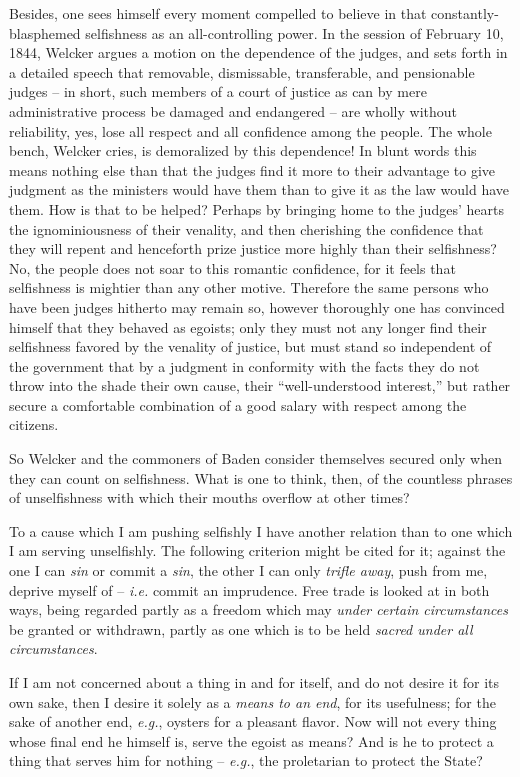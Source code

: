 \documentclass[12pt,a4paper]{book}
\begin{document}
Besides, one sees himself every moment compelled to believe in that 
constantly-blasphemed selfishness as an all-controlling power. In the session 
of February 10, 1844, Welcker argues a motion on the dependence of the judges, 
and sets forth in a detailed speech that removable, dismissable, transferable, 
and pensionable judges -- in short, such members of a court of justice as can 
by mere administrative process be damaged and endangered -- are wholly without 
reliability, yes, lose all respect and all confidence among the people. The 
whole bench, Welcker cries, is demoralized by this dependence! In blunt words 
this means nothing else than that the judges find it more to their advantage 
to give judgment as the ministers would have them than to give it as the law 
would have them. How is that to be helped? Perhaps by bringing home to the 
judges' hearts the ignominiousness of their venality, and then cherishing the 
confidence that they will repent and henceforth prize justice more highly than 
their selfishness? No, the people does not soar to this romantic confidence, 
for it feels that selfishness is mightier than any other motive. Therefore the 
same persons who have been judges hitherto may remain so, however thoroughly 
one has convinced himself that they behaved as egoists; only they must not any 
longer find their selfishness favored by the venality of justice, but must 
stand so independent of the government that by a judgment in conformity with 
the facts they do not throw into the shade their own cause, their 
``well-understood interest,'' but rather secure a comfortable combination of 
a good salary with respect among the citizens.

So Welcker and the commoners of Baden consider themselves secured only when 
they can count on selfishness. What is one to think, then, of the countless 
phrases of unselfishness with which their mouths overflow at other times?

To a cause which I am pushing selfishly I have another relation than to one 
which I am serving unselfishly. The following criterion might be cited for it; 
against the one I can \textit{sin} or commit a \textit{sin}, the other I can 
only \textit{trifle away}, push from me, deprive myself of -- \textit{i.e.} 
commit an imprudence. Free trade is looked at in both ways, being regarded 
partly as a freedom which may \textit{under certain circumstances} be granted 
or withdrawn, partly as one which is to be held \textit{sacred under all 
circumstances}.

If I am not concerned about a thing in and for itself, and do not desire it 
for its own sake, then I desire it solely as a \textit{means to an end}, for 
its usefulness; for the sake of another end, \textit{e.g.}, oysters for a 
pleasant flavor. Now will not every thing whose final end he himself is, serve 
the egoist as means? And is he to protect a thing that serves him for nothing 
-- \textit{e.g.}, the proletarian to protect the State?
\end{document}
